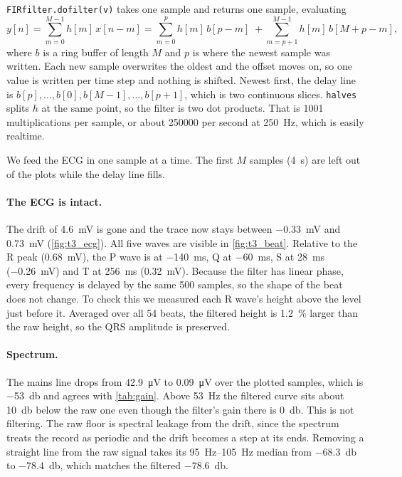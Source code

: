 \documentclass[11pt,a4paper]{article}
\begin{document}
\texttt{FIRfilter.dofilter(v)} takes one sample and returns one sample,
evaluating
\begin{equation}
  y[n] = \sum_{m=0}^{M-1} h[m]\,x[n-m]
       = \sum_{m=0}^{p} h[m]\,b[p-m] \;+\! \sum_{m=p+1}^{M-1} h[m]\,b[M+p-m],
  \label{eq:ring}
\end{equation}
where $b$ is a ring buffer of length $M$ and $p$ is where the newest sample was
written. Each new sample overwrites the oldest and the offset moves on, so one
value is written per time step and nothing is shifted. Newest first, the delay
line is $b[p],\dots,b[0],b[M-1],\dots,b[p+1]$, which is two continuous slices.
\texttt{halves} splits $h$ at the same point, so the filter is two dot
products. That is 1001 multiplications per sample, or about \num{250000} per
second at \SI{250}{\hertz}, which is easily realtime.

We feed the ECG in one sample at a time. The first $M$ samples
(\SI{4}{\second}) are left out of the plots while the delay line fills.

\paragraph{The ECG is intact.}
The drift of \SI{4.6}{\milli\volt} is gone and the trace now stays between
\SI{-0.33}{\milli\volt} and \SI{0.73}{\milli\volt} (\cref{fig:t3_ecg}). All
five waves are visible in \cref{fig:t3_beat}. Relative to the R peak
(\SI{0.68}{\milli\volt}), the P wave is at \SI{-140}{\milli\second}, Q at
\SI{-60}{\milli\second}, S at \SI{+28}{\milli\second}
(\SI{-0.26}{\milli\volt}) and T at \SI{+256}{\milli\second}
(\SI{0.32}{\milli\volt}). Because the filter has linear phase, every frequency
is delayed by the same 500 samples, so the shape of the beat does not change.
To check this we measured each R wave's height above the level just before it.
Averaged over all 54 beats, the filtered height is \SI{1.2}{\percent} larger
than the raw height, so the QRS amplitude is preserved.

\paragraph{Spectrum.}
The mains line drops from \SI{42.9}{\micro\volt} to \SI{0.09}{\micro\volt} over
the plotted samples, which is \SI{-53}{\decibel} and agrees with
\cref{tab:gain}. Above \SI{53}{\hertz} the filtered curve sits about
\SI{10}{\decibel} below the raw one even though the filter's gain there is
\SI{0}{\decibel}. This is not filtering. The raw floor is spectral leakage from
the drift, since the spectrum treats the record as periodic and the drift
becomes a step at its ends. Removing a straight line from the raw signal takes
its \SIrange{95}{105}{\hertz} median from \SI{-68.3}{\decibel} to
\SI{-78.4}{\decibel}, which matches the filtered \SI{-78.6}{\decibel}.
\end{document}
